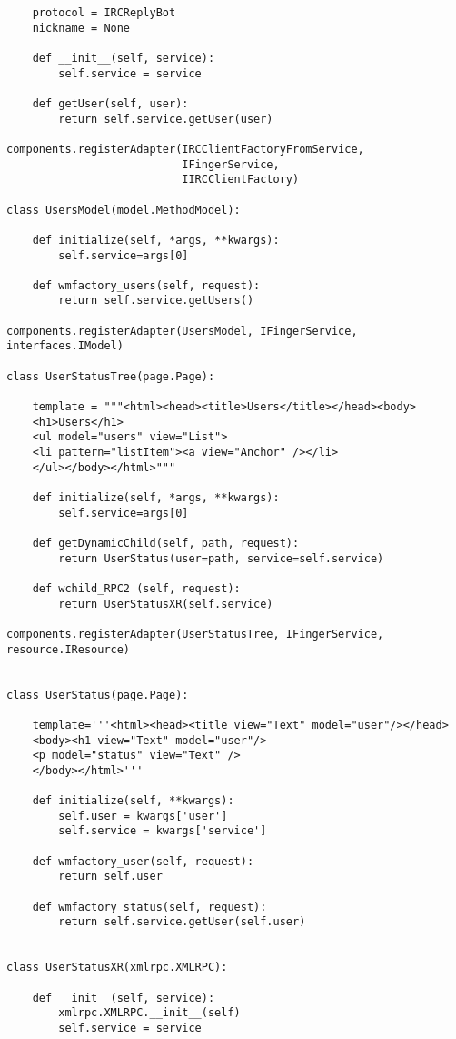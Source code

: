 \begin{verbatim}
    protocol = IRCReplyBot
    nickname = None

    def __init__(self, service):
        self.service = service

    def getUser(self, user):
        return self.service.getUser(user)

components.registerAdapter(IRCClientFactoryFromService,
                           IFingerService,
                           IIRCClientFactory)

class UsersModel(model.MethodModel):

    def initialize(self, *args, **kwargs):
        self.service=args[0]

    def wmfactory_users(self, request):
        return self.service.getUsers()

components.registerAdapter(UsersModel, IFingerService, interfaces.IModel)

class UserStatusTree(page.Page):

    template = """<html><head><title>Users</title></head><body>
    <h1>Users</h1>
    <ul model="users" view="List">
    <li pattern="listItem"><a view="Anchor" /></li>
    </ul></body></html>"""

    def initialize(self, *args, **kwargs):
        self.service=args[0]

    def getDynamicChild(self, path, request):
        return UserStatus(user=path, service=self.service)

    def wchild_RPC2 (self, request):
        return UserStatusXR(self.service)

components.registerAdapter(UserStatusTree, IFingerService, resource.IResource)


class UserStatus(page.Page):

    template='''<html><head><title view="Text" model="user"/></head>
    <body><h1 view="Text" model="user"/>
    <p model="status" view="Text" />
    </body></html>'''

    def initialize(self, **kwargs):
        self.user = kwargs['user']
        self.service = kwargs['service']

    def wmfactory_user(self, request):
        return self.user

    def wmfactory_status(self, request):
        return self.service.getUser(self.user)


class UserStatusXR(xmlrpc.XMLRPC):

    def __init__(self, service):
        xmlrpc.XMLRPC.__init__(self)
        self.service = service


\end{verbatim}
